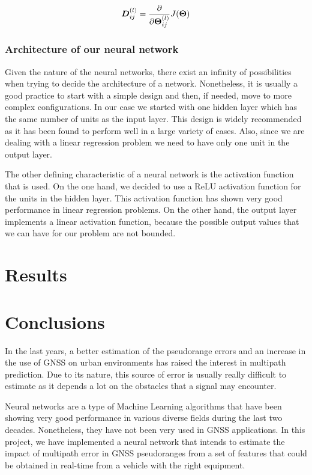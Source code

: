 \documentclass[a4paper, report, oneside, UKenglish]{memoir}
\newcommand{\bD}{\boldsymbol{D}}
\newcommand{\bTheta}{\boldsymbol{\Theta}}
\begin{document}
\begin{equation}
    \bD_{ij}^{(l)} = \pdv{}{\bTheta_{ij}^{(l)}} J(\bTheta)
\end{equation}


\subsection{Architecture of our neural network}
Given the nature of the neural networks, there exist an infinity of possibilities when trying to decide the architecture of a network. Nonetheless, it is usually a good practice to start with a simple design and then, if needed, move to more complex configurations. In our case we started with one hidden layer which has the same number of units as the input layer. This design is widely recommended as it has been found to perform well in a large variety of cases. Also, since we are dealing with a linear regression problem we need to have only one unit in the output layer.

The other defining characteristic of a neural network is the activation function that is used. On the one hand, we decided to use a ReLU activation function for the units in the hidden layer. This activation function has shown very good performance in linear regression problems. On the other hand, the output layer implements a linear activation function, because the possible output values that we can have for our problem are not bounded.


\chapter{Results} \label{ch:results}


\chapter{Conclusions}\label{ch:conclusions}
In the last years, a better estimation of the pseudorange errors and an increase in the use of GNSS on urban environments has raised the interest in multipath prediction. Due to its nature, this source of error is usually really difficult to estimate as it depends a lot on the obstacles that a signal may encounter. 

Neural networks are a type of Machine Learning algorithms that have been showing very good performance in various diverse fields during the last two decades. Nonetheless, they have not been very used in GNSS applications. In this project, we have implemented a neural network that intends to estimate the impact of multipath error in GNSS pseudoranges from a set of features that could be obtained in real-time from a vehicle with the right equipment.



\clearpage
\printbibliography
\end{document}
